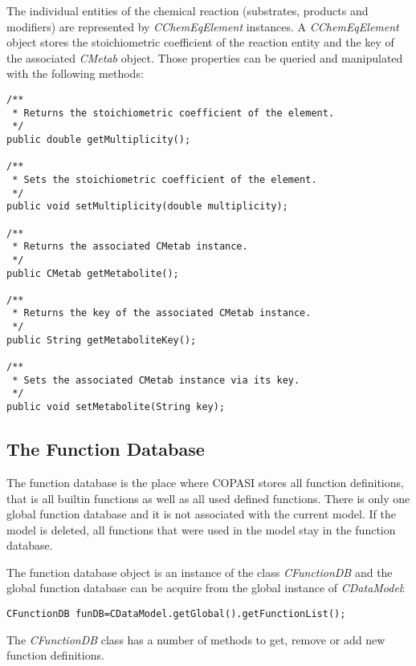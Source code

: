 \documentclass[a4,10pt]{article}
\begin{document}
The individual entities of the chemical reaction (substrates, products and modifiers) are
represented by \textit{CChemEqElement} instances. A \textit{CChemEqElement} object stores the stoichiometric coefficient of the reaction entity  and the key of the associated \textit{CMetab} object. Those properties can be queried and manipulated with the following methods:

\begin{lstlisting}
/**
 * Returns the stoichiometric coefficient of the element.
 */
public double getMultiplicity();

/**
 * Sets the stoichiometric coefficient of the element.
 */
public void setMultiplicity(double multiplicity);

/**
 * Returns the associated CMetab instance.
 */
public CMetab getMetabolite();

/**
 * Returns the key of the associated CMetab instance.
 */
public String getMetaboliteKey();

/**
 * Sets the associated CMetab instance via its key.
 */
public void setMetabolite(String key);
\end{lstlisting}

\subsection{The Function Database}
The function database is the place where COPASI stores all function definitions, that is all builtin functions as well as all used defined functions. There is only one global function database and it is not associated with the current model. If the model is deleted, all functions that were used in the model stay in the function database.

The function database object is an instance of the class \textit{CFunctionDB} and the global function database can be acquire from the global instance of \textit{CDataModel}:

\begin{lstlisting}
CFunctionDB funDB=CDataModel.getGlobal().getFunctionList();
\end{lstlisting}

The \textit{CFunctionDB} class has a number of methods to get, remove or add new function definitions.
\end{document}
